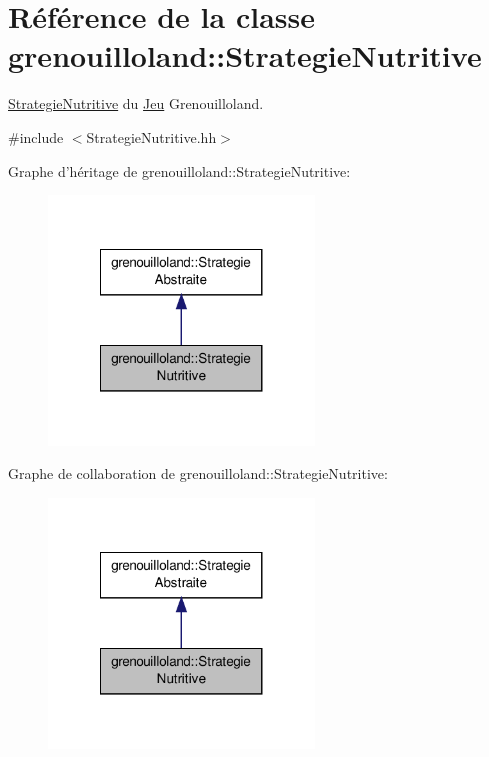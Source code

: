 \hypertarget{classgrenouilloland_1_1StrategieNutritive}{\section{Référence de la classe grenouilloland\-:\-:Strategie\-Nutritive}
\label{classgrenouilloland_1_1StrategieNutritive}
}


\hyperlink{classgrenouilloland_1_1StrategieNutritive}{Strategie\-Nutritive} du \hyperlink{classgrenouilloland_1_1Jeu}{Jeu} Grenouilloland.  




{\ttfamily \#include $<$Strategie\-Nutritive.\-hh$>$}



Graphe d'héritage de grenouilloland\-:\-:Strategie\-Nutritive\-:
\nopagebreak
\begin{figure}[H]
\begin{center}
\leavevmode
\includegraphics[width=200pt]{classgrenouilloland_1_1StrategieNutritive__inherit__graph}
\end{center}
\end{figure}


Graphe de collaboration de grenouilloland\-:\-:Strategie\-Nutritive\-:
\nopagebreak
\begin{figure}[H]
\begin{center}
\leavevmode
\includegraphics[width=200pt]{classgrenouilloland_1_1StrategieNutritive__coll__graph}
\end{center}
\end{figure}
